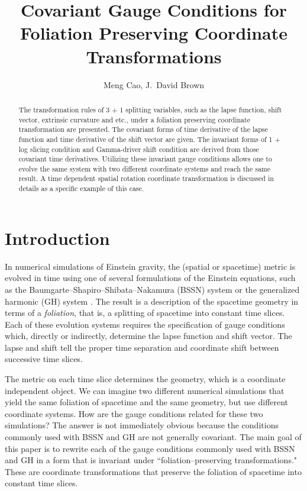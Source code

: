 \documentclass[letterpaper,nofootinbib,prd,amsmath,onecolumn]{revtex4-1}
\begin{document}

\title{Covariant Gauge Conditions for Foliation Preserving Coordinate Transformations}
\author{Meng Cao, J.~David Brown}

\begin{abstract}
The transformation rules of 3 + 1 splitting variables, such as the lapse function, shift vector, extrinsic curvature and etc., under a foliation preserving coordinate transformation are presented. The covariant forms of time derivative of the lapse function and time derivative of the shift vector are given. The invariant forms of 1 + log slicing condition and Gamma-driver shift condition are derived from those covariant time derivatives. Utilizing these invariant gauge conditions allows one to evolve the same system with two different coordinate systems and reach the same result. A time dependent spatial rotation coordinate transformation is discussed in details as a specific example of this case.  
\end{abstract}
\maketitle

\section{Introduction}
In numerical simulations of Einstein gravity, the (spatial or spacetime) metric is evolved in time using one of several formulations of the Einstein equations, such as the 
Baumgarte--Shapiro--Shibata--Nakamura (BSSN) system \cite{Shibata:1995we,Baumgarte:1998te} or the generalized harmonic (GH) 
system \cite{Friedrich:1985,Garfinkle:2001ni}. The result is a description of the spacetime geometry in terms of a {\em foliation}, that is, a splitting of spacetime into 
constant time slices. 
Each of these evolution systems requires the specification of gauge conditions which, directly or indirectly, determine the lapse function and shift vector. 
The lapse and shift tell the proper time separation and coordinate shift between successive time slices. 

The metric on each time slice determines the geometry, which is a coordinate independent object. We can imagine two different numerical simulations that yield the 
same foliation of spacetime and the same geometry, but use different coordinate systems. How are the gauge conditions related for these two simulations? The 
answer is not immediately obvious because the conditions commonly used with BSSN and GH are not generally covariant. 
The main goal of this paper is to rewrite each of the gauge conditions commonly used with BSSN and GH in a form that is invariant under ``foliation--preserving transformations." 
These are coordinate transformations that preserve the foliation of spacetime into constant time slices. 
\end{document}
